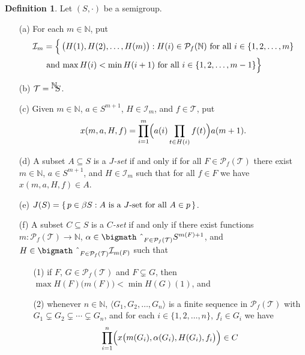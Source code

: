 \documentclass[12pt]{article}
\theoremstyle{plain}
\theoremstyle{definition}
\newtheorem{defn}[thm]{Definition}
\newcommand{\la}{\langle}
\newcommand{\ra}{\rangle}
\newcommand{\bbN}{\mathbb{N}}
\newcommand{\setfunc}[2]{\hbox{${}^{\hbox{$#1$}}\hskip -3 pt #2$}}
\newcommand{\bigtimes}{\hbox{\bigmath \char'2}}
\begin{document}
  \begin{defn}
    Let $(S, \cdot)$ be a semigroup.
      \begin{itemize}
        \item[(a)] For each $m \in \bbN$, put 
          \begin{align*}
            \mathcal{I}_m &= \Bigl\{\, \bigl( H(1), H(2), \ldots, H(m)
            \bigr) : \hbox{$H(i) \in \mathcal{P}_f(\bbN)$ for all $i
              \in \{1, 2, \ldots, m\}$} \\
            &\hbox{ and $\max H(i) < \min H(i+1)$
            for all $i \in \{1, 2, \ldots, m-1\}$} \Bigr\}
         \end{align*}
        \item[(b)] $\mathcal{T} = \setfunc{\bbN}{S}$. 
        \item[(c)] Given $m \in \bbN$, $a \in S^{m+1}$, $H \in
          \mathcal{I}_m$, and $f \in \mathcal{T}$, put 
            \[
            x(m, a, H, f) = \prod_{i=1}^m\Bigl(a(i)\prod_{t \in H(i)}
            f(t) \Bigr)a(m+1).
            \]
        \item[(d)] A subset $A \subseteq S$ is a \textsl{$J$-set} if
          and only if for all $F \in \mathcal{P}_f(\mathcal{T})$ there
          exist $m \in \bbN$, $a \in S^{m+1}$, and $H \in \mathcal{I}_m$
          such that for all $f \in F$ we have $x(m,a,H,f) \in A$.
        \item[(e)] $J(S) = \{\, p \in \beta S : \hbox{$A$ is a $J$-set
            for all $A \in p$} \,\}$.
        \item[(f)] A subset $C \subseteq S$ is a \textsl{$C$-set} if
          and only if there exist functions $m :
          \mathcal{P}_f(\mathcal{T}) \to \bbN$, $\alpha \in
          \bigtimes_{F \in \mathcal{P}_f(\mathcal{T})} S^{m(F)+1}$,
          and $H \in \bigtimes_{F \in \mathcal{P}_f(\mathcal{T})}
          \mathcal{I}_{m(F)}$ such that

          \begin{itemize}
            \item[(1)] if $F$, $G \in \mathcal{P}_f(\mathcal{T})$ and $F
              \subsetneq G$, then $\max H(F)\bigl(m(F)\bigr) < \min
              H(G)(1)$, and
           \item[(2)] whenever $n \in \bbN$, $\la G_1, G_2, \ldots, G_n
              \ra$ is a finite sequence in $\mathcal{P}_f(\mathcal{T})$
              with $G_1 \subsetneq G_2 \subsetneq \cdots \subsetneq G_n$,
              and for each $i \in \{1, 2, \ldots, n\}$, $f_i \in G_i$ we
              have
              \[
              \prod_{i=1}^n\Bigl(x\bigl(m(G_i), \alpha(G_i), H(G_i),
              f_i\bigr)\Bigr) \in C
             \]
      \end{itemize}
    \end{itemize}
  \end{defn}
\end{document}
